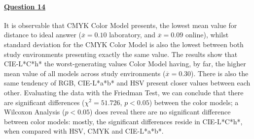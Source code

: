 \paragraph{\ul{Question 14}}
%
It is observable that CMYK Color Model presents, the lowest mean value for distance to ideal answer ($\overline{x} = 0.10$ laboratory, and $\overline{x} = 0.09$ online), whilst standard deviation for the CMYK Color Model is also the
lowest between both study environments presenting exactly the same value.
The results show that CIE-L*C*h* the worst-generating values Color Model having, by far, the higher mean value of all models across study environments ($\overline{x} = 0.30$). There is also the same tendency of RGB,
CIE-L*a*b* and HSV present closer values between each other. Evaluating the data with the Friedman Test, we can conclude that there are significant differences ($\chi^2 = 51.726$, $p < 0.05$)
between the color models; a Wilcoxon Analysis ($p < 0.05$) does reveal there are no significant difference between color models: mostly, the significant differences reside in CIE-L*C*h*, when
compared with HSV, CMYK and CIE-L*a*b*. \par
%
